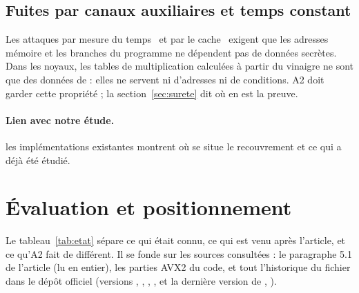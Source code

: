 \subsection{Fuites par canaux auxiliaires et temps constant}
Les attaques par mesure du temps~\cite{kocher} et par le cache~\cite{bernstein} exigent que les adresses mémoire et les branches du programme ne dépendent pas de données secrètes. Dans les noyaux, les tables de multiplication calculées à partir du vinaigre ne sont que des données de \vpshufb{} : elles ne servent ni d'adresses ni de conditions. A2 doit garder cette propriété ; la section~\ref{sec:surete} dit où en est la preuve.

\paragraph{Lien avec notre étude.} les implémentations existantes montrent où se situe le recouvrement et ce qui a déjà été étudié.

\section{Évaluation et positionnement}
Le tableau~\ref{tab:etat} sépare ce qui était connu, ce qui est venu après l'article, et ce qu'A2 fait de différent. Il se fonde sur les sources consultées : le paragraphe 5.1 de l'article (lu en entier), les parties AVX2 du code, et tout l'historique du fichier  dans le dépôt officiel (versions , , , ,  et la dernière version de , ).


